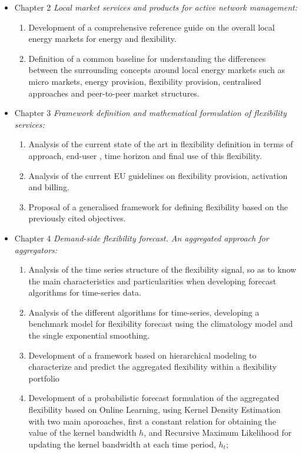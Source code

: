 \begin{itemize}
\item Chapter 2 \textit{Local market services and products for active network management:} 
	\begin{enumerate}
		\item Development of a comprehensive reference guide on the overall local energy markets for energy and flexibility.
		\item Definition of a common baseline for understanding the differences between the surrounding concepts around local energy markets such as micro markets, energy provision, flexibility provision, centralised approaches and peer-to-peer market structures.  
	\end{enumerate}
\item Chapter 3 \textit{Framework definition and mathematical formulation of flexibility services:} 
	\begin{enumerate}
		\item Analysis of the current state of the art in flexibility definition in terms of approach, end-user , time horizon and final use of this flexibility. 
		\item Analysis of the current EU guidelines on flexibility provision, activation and billing. 
		\item Proposal of a generalised framework for defining flexibility based on the previously cited objectives. 
	\end{enumerate}
\item Chapter 4 \textit{Demand-side flexibility forecast. An aggregated approach for aggregators:} 
	\begin{enumerate}
		\item Analysis of the time series structure of the flexibility signal, so as to know the main characteristics and particularities when developing forecast algorithms for time-series data. 
		\item Analysis of the different algorithms for time-series, developing a benchmark model for flexibility forecast using the climatology model and the single exponential smoothing. 
		\item Development of a framework based on hierarchical modeling to characterize and predict the aggregated flexibility within a flexibility portfolio
		\item Development  of a probabilistic forecast formulation of the aggregated flexibility based on Online Learning, using Kernel Density Estimation with two main aporoaches, first a constant relation for obtaining the value of the kernel bandwidth $h$, and Recursive Maximum Likelihood for updating the kernel bandwidth at each time period, $h_t$;

\end{enumerate}
\end{itemize}
